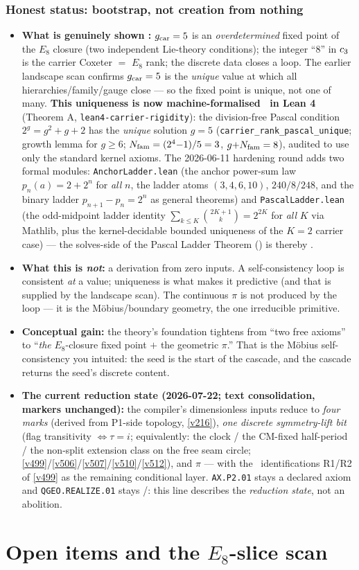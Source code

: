 \section{Honest status: bootstrap, not creation from nothing}
\begin{itemize}[leftmargin=1.4em]
\item \textbf{What is genuinely shown \mE:} $g_{\mathrm{car}}=5$ is an \emph{overdetermined} fixed point of the
  $E_8$ closure (two independent Lie-theory conditions); the integer ``$8$'' in $c_3$ is the carrier
  Coxeter $=$ $E_8$ rank; the discrete data closes a loop. The earlier landscape scan confirms
  $g_{\mathrm{car}}=5$ is the \emph{unique} value at which all hierarchies/family/gauge close --- so the fixed point
  is unique, not one of many. \textbf{This uniqueness is now machine-formalised \mE\ in Lean 4} (Theorem A,
  \texttt{lean4-carrier-rigidity}): the division-free Pascal condition $2^{g}=g^2+g+2$ has the \emph{unique}
  solution $g=5$ (\texttt{carrier\_rank\_pascal\_unique}; growth lemma for $g\ge6$; $N_{\mathrm{fam}}=(2^{4}{-}1)/5=3$,
  $g{+}N_{\mathrm{fam}}=8$), audited to use only the standard kernel axioms. The 2026-06-11 hardening round adds two
  formal modules: \texttt{AnchorLadder.lean} (the anchor power-sum law $p_n(a)=2+2^n$ for \emph{all} $n$,
  the ladder atoms $(3,4,6,10)$, $240/8/248$, and the binary ladder $p_{n+1}{-}p_n=2^n$ as general
  theorems) and \texttt{PascalLadder.lean} (the odd-midpoint ladder identity
  $\sum_{k\le K}\binom{2K+1}k=2^{2K}$ for \emph{all} $K$ via Mathlib, plus the kernel-decidable bounded
  uniqueness of the $K{=}2$ carrier case) --- the solves-side of the Pascal Ladder Theorem
  () is thereby \mE.
\item \textbf{What this is \emph{not}:} a derivation from zero inputs. A self-consistency loop is
  consistent \emph{at} a value; uniqueness is what makes it predictive (and that is supplied by the
  landscape scan). The continuous $\pi$ is not produced by the loop --- it is the Möbius/boundary
  geometry, the one irreducible primitive.
\item \textbf{Conceptual gain:} the theory's foundation tightens from ``two free axioms'' to ``\emph{the}
  $E_8$-closure fixed point $+$ the geometric $\pi$.'' That is the Möbius self-consistency you intuited:
  the seed is the start of the cascade, and the cascade returns the seed's discrete content.
\item \textbf{The current reduction state (2026-07-22; text consolidation, markers unchanged):} the
  compiler's dimensionless inputs reduce to \emph{four marks} (derived from P1-side topology,
  \vref{v216}), \emph{one discrete symmetry-lift bit} (flag transitivity $\iff\tau=i$; equivalently:
  the clock / the CM-fixed half-period / the non-split extension class on the free seam circle;
  \vref{v499}/\vref{v506}/\vref{v507}/\vref{v510}/\vref{v512}), and $\pi$ --- with the \mC\
  identifications R1/R2
  of \vref{v499} as the remaining conditional layer. \texttt{AX.P2.01} stays a declared axiom and
  \texttt{QGEO.REALIZE.01} stays \mC/\mO: this line describes the \emph{reduction state}, not an
  abolition.
\end{itemize}

\clearpage
\part{Open items and the $E_8$-slice scan}

